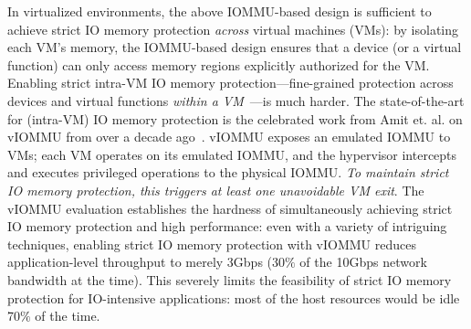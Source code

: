 In virtualized environments, the above IOMMU-based design is sufficient 
    to achieve strict IO memory protection \textit{across} virtual machines (VMs): 
    by isolating each VM's memory, the IOMMU-based design ensures that 
    a device (or a virtual function) can only access memory regions explicitly 
    authorized for the VM. 
Enabling strict intra-VM IO memory protection---fine-grained protection across devices and virtual functions 
    \textit{within a VM}~\cite{Amit2011vIOMMU,RajapakshaIOMMU,AlexCodeInjection}---is much harder. 
The state-of-the-art for (intra-VM) IO memory protection is the celebrated work from Amit et. al. on vIOMMU 
    from over a decade ago~\cite{Amit2011vIOMMU}. 
vIOMMU exposes an emulated IOMMU to VMs; each VM operates on its emulated IOMMU, 
    and the hypervisor intercepts and executes privileged operations to the physical IOMMU. 
\textit{To maintain strict IO memory protection, this triggers at least one unavoidable VM exit}. 
The vIOMMU evaluation establishes the hardness of simultaneously achieving strict IO memory protection and high performance: 
    even with a variety of intriguing techniques, 
    enabling strict IO memory protection with vIOMMU reduces application-level throughput to merely 3Gbps 
    (30$\%$ of the 10Gbps network bandwidth at the time). 
This severely limits the feasibility of strict IO memory protection 
    for IO-intensive applications: most of the host resources would be idle 70$\%$ of the time.

